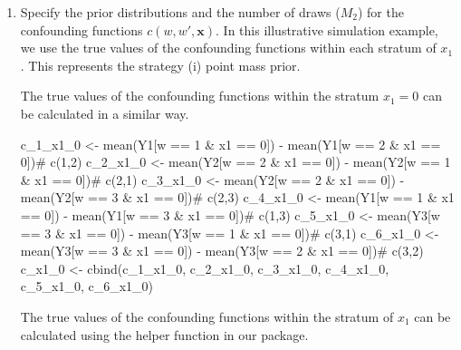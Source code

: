 \begin{enumerate}
\item Specify the prior distributions  and the number of draws ($M_2$) for the confounding functions $c(w,w',\bm{x})$. In this illustrative simulation example, we use the true values of the confounding functions within each stratum of $x_1$. This represents the strategy (i) point mass prior. 

\begin{Schunk}
\end{Schunk}

The true values of the confounding functions within the stratum $x_1 = 0$ can be calculated in a similar way.
\begin{Schunk}
\begin{Sinput}
c_1_x1_0 <- mean(Y1[w == 1 & x1 == 0]) - mean(Y1[w == 2 & x1 == 0])# c(1,2)
c_2_x1_0 <- mean(Y2[w == 2 & x1 == 0]) - mean(Y2[w == 1 & x1 == 0])# c(2,1)
c_3_x1_0 <- mean(Y2[w == 2 & x1 == 0]) - mean(Y2[w == 3 & x1 == 0])# c(2,3)
c_4_x1_0 <- mean(Y1[w == 1 & x1 == 0]) - mean(Y1[w == 3 & x1 == 0])# c(1,3)
c_5_x1_0 <- mean(Y3[w == 3 & x1 == 0]) - mean(Y3[w == 1 & x1 == 0])# c(3,1)
c_6_x1_0 <- mean(Y3[w == 3 & x1 == 0]) - mean(Y3[w == 2 & x1 == 0])# c(3,2)
c_x1_0 <- cbind(c_1_x1_0, c_2_x1_0, c_3_x1_0, c_4_x1_0, c_5_x1_0, c_6_x1_0) 
\end{Sinput}
\end{Schunk}

The true values of the confounding functions within the stratum of $x_1$ can be calculated using the helper function  in our package.


\end{enumerate}

